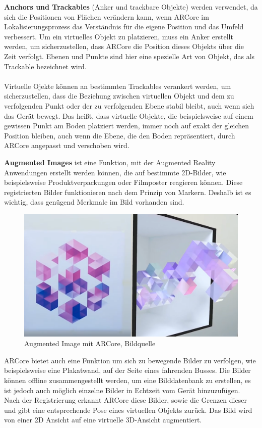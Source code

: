 \textbf{Anchors und Trackables} (Anker und trackbare Objekte) werden verwendet, da sich die Positionen von Flächen verändern kann, wenn ARCore im Lokalisierungsprozess das Verständnis für die eigene Position und das Umfeld verbessert. Um ein virtuelles Objekt zu platzieren, muss ein Anker erstellt werden, um sicherzustellen, dass ARCore die Position dieses Objekts über die Zeit verfolgt. Ebenen und Punkte sind hier eine spezielle Art von Objekt, das als \glqq Trackable\grqq{} bezeichnet wird. \\ \\ Virtuelle Ojekte können an bestimmten Trackables verankert werden, um sicherzustellen, dass die Beziehung zwischen virtuellen Objekt und dem zu verfolgenden Punkt oder der zu verfolgenden Ebene stabil bleibt, auch wenn sich das Gerät bewegt. Das heißt, dass virtuelle Objekte, die beispielsweise auf einem gewissen Punkt am Boden platziert werden, immer noch auf exakt der gleichen Position bleiben, auch wenn die Ebene, die den Boden repräsentiert, durch ARCore angepasst und verschoben wird.

\textbf{Augmented Images} ist eine Funktion, mit der Augmented Reality Anwendungen erstellt werden können, die auf bestimmte 2D-Bilder, wie beispielsweise Produktverpackungen oder Filmposter reagieren können. Diese registrierten Bilder funktionieren nach dem Prinzip von Markern. Deshalb ist es wichtig, dass genügend Merkmale im Bild vorhanden sind.\\

\begin{figure}[H]
	\centering
	\includegraphics[scale=0.45]{augmented.png}
	\caption{Augmented Image mit ARCore, Bildquelle \cite{augmented_images}}
\end{figure} 

ARCore bietet auch eine Funktion um sich zu bewegende Bilder zu verfolgen, wie beispielsweise eine Plakatwand, auf der Seite eines fahrenden Busses. Die Bilder können offline zusammengestellt werden, um eine Bilddatenbank zu erstellen, es ist jedoch auch möglich einzelne Bilder in Echtzeit vom Gerät hinzuzufügen. Nach der Registrierung erkannt ARCore diese Bilder, sowie die Grenzen dieser und gibt eine entsprechende Pose eines virtuellen Objekts zurück. Das Bild wird von einer 2D Ansicht auf eine virtuelle 3D-Ansicht augmentiert.

